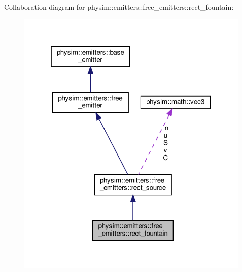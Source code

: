 Collaboration diagram for physim\+:\+:emitters\+:\+:free\+\_\+emitters\+:\+:rect\+\_\+fountain\+:\nopagebreak
\begin{figure}[H]
\begin{center}
\leavevmode
\includegraphics[width=316pt]{classphysim_1_1emitters_1_1free__emitters_1_1rect__fountain__coll__graph}
\end{center}
\end{figure}
